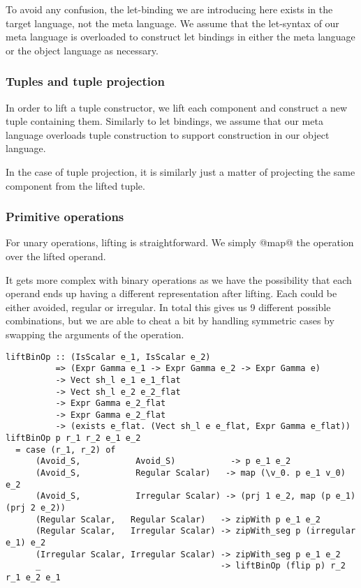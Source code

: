 To avoid any confusion, the let-binding we are introducing here exists in the target language, not the meta language. We assume that the let-syntax of our meta language is overloaded to construct let bindings in either the meta language or the object language as necessary.

\subsubsection{Tuples and tuple projection}
In order to lift a tuple constructor, we lift each component and construct a new tuple containing them. Similarly to let bindings, we assume that our meta language overloads tuple construction to support construction in our object language.

In the case of tuple projection, it is similarly just a matter of projecting the same component from the lifted tuple.

\subsubsection{Primitive operations}
For unary operations, lifting is straightforward. We simply @map@ the operation over the lifted operand.

It gets more complex with binary operations as we have the possibility that each operand ends up having a different representation after lifting. Each could be either avoided, regular or irregular. In total this gives us 9 different possible combinations, but we are able to cheat a bit by handling symmetric cases by swapping the arguments of the operation.
%
\begin{lstlisting}[style=ndp]
liftBinOp :: (IsScalar e_1, IsScalar e_2)
          => (Expr Gamma e_1 -> Expr Gamma e_2 -> Expr Gamma e)
          -> Vect sh_l e_1 e_1_flat
          -> Vect sh_l e_2 e_2_flat
          -> Expr Gamma e_2_flat
          -> Expr Gamma e_2_flat
          -> (exists e_flat. (Vect sh_l e e_flat, Expr Gamma e_flat))
liftBinOp p r_1 r_2 e_1 e_2
  = case (r_1, r_2) of
      (Avoid_S,           Avoid_S)           -> p e_1 e_2
      (Avoid_S,           Regular Scalar)   -> map (\v_0. p e_1 v_0) e_2
      (Avoid_S,           Irregular Scalar) -> (prj 1 e_2, map (p e_1) (prj 2 e_2))
      (Regular Scalar,   Regular Scalar)   -> zipWith p e_1 e_2
      (Regular Scalar,   Irregular Scalar) -> zipWith_seg p (irregular e_1) e_2
      (Irregular Scalar, Irregular Scalar) -> zipWith_seg p e_1 e_2
      _                                    -> liftBinOp (flip p) r_2 r_1 e_2 e_1
\end{lstlisting}
%

